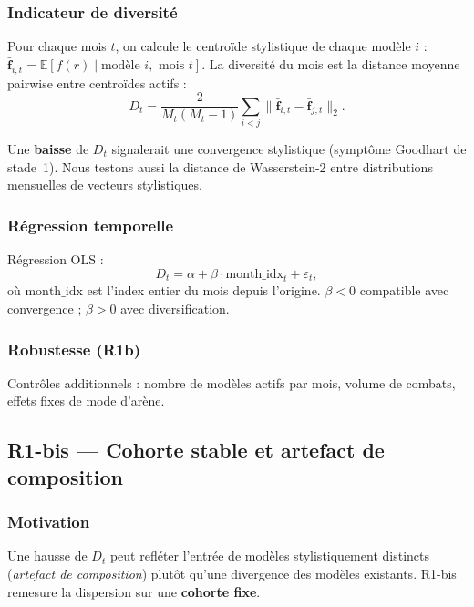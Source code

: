 \documentclass[11pt,a4paper]{article}
\begin{document}
\subsubsection{Indicateur de diversité}

Pour chaque mois $t$, on calcule le centroïde stylistique de chaque modèle $i$ :
$\bar{\mathbf{f}}_{i,t} = \mathbb{E}[f(r) \mid \text{modèle } i, \text{ mois } t]$.
La diversité du mois est la distance moyenne pairwise entre centroïdes actifs :
\begin{equation}
  D_t = \frac{2}{M_t(M_t-1)} \sum_{i<j} \|\bar{\mathbf{f}}_{i,t} - \bar{\mathbf{f}}_{j,t}\|_2.
\end{equation}

Une \textbf{baisse} de $D_t$ signalerait une convergence stylistique (symptôme
Goodhart de stade~1). Nous testons aussi la distance de Wasserstein-2 entre
distributions mensuelles de vecteurs stylistiques.

\subsubsection{Régression temporelle}

Régression OLS :
\begin{equation}
  D_t = \alpha + \beta \cdot \text{month\_idx}_t + \varepsilon_t,
\end{equation}
où $\text{month\_idx}$ est l'index entier du mois depuis l'origine.
$\beta < 0$ compatible avec convergence ; $\beta > 0$ avec diversification.

\subsubsection{Robustesse (R1b)}

Contrôles additionnels : nombre de modèles actifs par mois, volume de combats,
effets fixes de mode d'arène.

\subsection{R1-bis --- Cohorte stable et artefact de composition}

\subsubsection{Motivation}

Une hausse de $D_t$ peut refléter l'entrée de modèles stylistiquement distincts
(\emph{artefact de composition}) plutôt qu'une divergence des modèles existants.
R1-bis remesure la dispersion sur une \textbf{cohorte fixe}.
\end{document}
